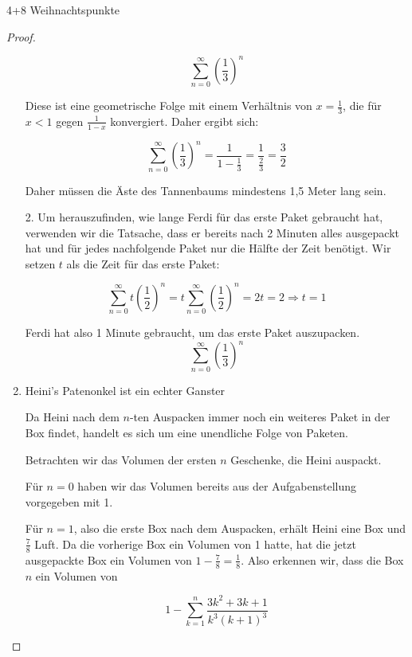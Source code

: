 \documentclass{problemset}
\begin{document}
\begin{problem}[Weihnachtsaufgaben*]{4+8 Weihnachtspunkte}
\begin{proof}
\begin{enumerate}
              \[
                  \sum_{n=0}^{\infty} {\left(\frac{1}{3}\right)}^n
              \]

              Diese ist eine geometrische Folge mit einem Verhältnis von \(x = \frac{1}{3}\),
              die für \(x < 1\) gegen \(\frac{1}{1 - x}\) konvergiert. Daher ergibt sich:

              \[
                  \sum_{n=0}^{\infty} {\left(\frac{1}{3}\right)}^n = \frac{1}{1 - \frac{1}{3}} = \frac{1}{\frac{2}{3}} = \frac{3}{2}
              \]

              Daher müssen die Äste des Tannenbaums mindestens 1,5 Meter lang sein.

              2. Um herauszufinden, wie lange Ferdi für das erste Paket gebraucht hat, verwenden wir die Tatsache, dass er bereits nach 2 Minuten alles ausgepackt hat und für jedes nachfolgende Paket nur die Hälfte der Zeit benötigt.
              Wir setzen $t$ als die Zeit für das erste Paket:

              \[
                  \sum_{n=0}^{\infty} t {\left(\frac{1}{2}\right)}^n = t \sum_{n=0}^{\infty} {\left(\frac{1}{2}\right)}^n = 2t = 2 \Rightarrow t = 1
              \]

              Ferdi hat also 1 Minute gebraucht, um das erste Paket auszupacken.
              \[
                  \sum_{n=0}^{\infty} {\left(\frac{1}{3}\right)}^n
              \]

        \item Heini's Patenonkel ist ein echter Ganster

              Da Heini nach dem $n$-ten Auspacken immer noch ein weiteres Paket in der Box
              findet, handelt es sich um eine unendliche Folge von Paketen.

              Betrachten wir das Volumen der ersten $n$ Geschenke, die Heini auspackt.

              Für $n = 0$ haben wir das Volumen bereits aus der Aufgabenstellung vorgegeben
              mit 1.

              Für $n = 1$, also die erste Box nach dem Auspacken, erhält Heini eine Box und
              $\frac{7}{8}$ Luft. Da die vorherige Box ein Volumen von 1 hatte, hat die jetzt
              ausgepackte Box ein Volumen von $1 - \frac{7}{8} = \frac{1}{8}$. Also erkennen
              wir, dass die Box $n$ ein Volumen von

              \[
                  1 - \sum_{k=1}^n \frac{3k^2 + 3k + 1}{k^3{(k+1)}^3}
              \]


\end{enumerate}
\end{proof}
\end{problem}
\end{document}
